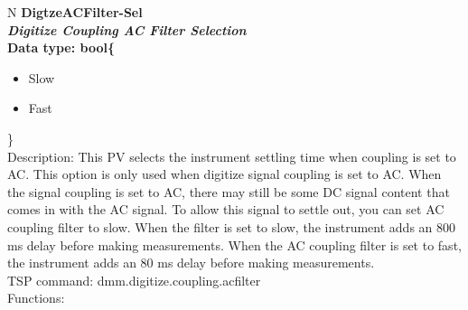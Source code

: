 \documentclass[openany]{article}
\begin{document}
		\begin{tabular}{N}
			\hline
			\bfseries DigtzeACFilter-Sel\label{pv:digtzeacfilter-sel} \\ \hline
			\emph{Digitize Coupling AC Filter Selection} \\
			Data type: bool\{\begin{itemize}[noitemsep]
				\small
				\item[] Slow
				\item[] Fast
			\end{itemize}\} \\
			Description: This PV selects the instrument settling time when coupling is set to AC. This option is only used when digitize signal coupling is set to AC. When the signal coupling is set to AC, there may still be some DC signal content that comes in with the AC signal. To allow this signal to settle out, you can set AC coupling filter to slow. When the filter is set to slow, the instrument adds an 800 ms delay before making measurements. When the AC coupling filter is set to fast, the instrument adds an 80 ms delay before making measurements. \\
			TSP command: dmm.digitize.coupling.acfilter \\
			Functions: \\
			\arrayrulecolor{\FuncTableBorderColor}

		\end{tabular}
\end{document}
